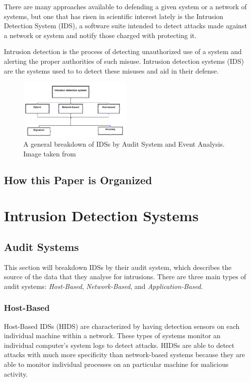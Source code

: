 \documentclass{acm_proc_article-sp}
\begin{document}
	There are many approaches available to defending a given system or a network of systems, but one that has risen in scientific interest lately is the Intrusion Detection System (IDS), a software suite intended to detect attacks made against a network or system and notify those charged with protecting it.
	
	Intrusion detection is the process of detecting unauthorized use of a system and alerting the proper authorities of such misuse. Intrusion detection systems (IDS) are the systems used to to detect these misuses and aid in their defense. 
	\begin{figure}[h!]
		\centering
		\includegraphics[width=0.5\textwidth]{idsBreakdown.png}
		\caption{A general breakdown of IDSs by Audit System and Event Analysis. Image taken from \cite{Alenezi2012}}
		\label{breakdown}
	\end{figure}
    \subsection{How this Paper is Organized}
    	
\section{Intrusion Detection Systems}

    \subsection{Audit Systems}
    	This section will breakdown IDSs by their audit system, which describes the source of the data that they analyse for intrusions. There are three main types of audit systems: \emph{Host-Based}, \emph{Network-Based}, and \emph{Application-Based}.
    	\subsubsection{Host-Based} %
    		Host-Based IDSs (HIDS) are characterized by having detection sensors on each individual machine within a network. These types of systems monitor an individual computer's system logs to detect attacks. HIDSs are able to detect attacks with much more specificity than network-based systems because they are able to monitor individual processes on an particular machine for malicious activity. 
    		
\end{document}
